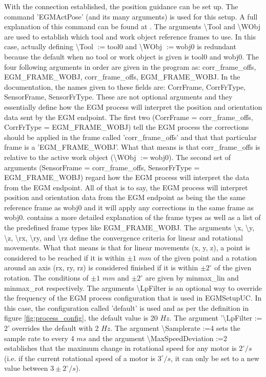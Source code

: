\documentclass{cslthse-msc}
\begin{document}
With the connection established, the position guidance can be set up. The command 'EGMActPose' (and its many arguments) is used for this setup. A full explanation of this command can be found at \cite[Sec. 1.67]{ABB:rapid_instructions}. The arguments \textbackslash Tool and \textbackslash WObj are used to establish which tool and work object reference frames to use. In this case, actually defining \textbackslash Tool $:=$tool0 and \textbackslash WObj $:=$wobj0 is redundant because the default when no tool or work object is given is tool0 and wobj0. The four following arguments in order are given in the program as: corr\_frame\_offs, {\scriptsize{EGM\_FRAME\_WOBJ}}, corr\_frame\_offs, {\scriptsize{EGM\_FRAME\_WOBJ}}. In the documentation, the names given to these fields are: CorrFrame, CorrFrType, SensorFrame, SensorFrType. These are not optional arguments and they essentially define how the EGM process will interpret the position and orientation data sent by the EGM endpoint. The first two (CorrFrame = corr\_frame\_offs, CorrFrType = {\scriptsize{EGM\_FRAME\_WOBJ}}) tell the EGM process the corrections should be applied in the frame called 'corr\_frame\_offs' and that that particular frame is a '{\scriptsize{EGM\_FRAME\_WOBJ}}'. What that means is that corr\_frame\_offs is relative to the active work object (\textbackslash WObj $:=$wobj0). The second set of arguments (SensorFrame = corr\_frame\_offs, SensorFrType = {\scriptsize{EGM\_FRAME\_WOBJ}}) regard how the EGM process will interpret the data from the EGM endpoint. All of that is to say, the EGM process will interpret position and orientation data from the EGM endpoint as being the the same reference frame as wobj0 and it will apply any corrections in the same frame as wobj0. \cite[Sec. 3.24]{ABB:rapid_instructions} contains a more detailed explanation of the frame types as well as a list of the predefined frame types like {\scriptsize{EGM\_FRAME\_WOBJ}}. The arguments \textbackslash x, \textbackslash y, \textbackslash z, \textbackslash rx, \textbackslash ry, and \textbackslash rz define the convergence criteria for linear and rotational movements. What that means is that for linear movements (x, y, z), a point is considered to be reached if it is within $\pm 1$ $mm$ of the given point and a rotation around an axis (rx, ry, rz) is considered finished if it is within $\pm 2^{\circ}$ of the given rotation. The conditions of $\pm 1$ $mm$ and $\pm 2^{\circ}$ are given by minmax\_lin and minmax\_rot respectively. The arguments \textbackslash LpFilter is an optional way to override the frequency of the EGM process configuration that is used in EGMSetupUC. In this case, the configuration called 'default' is used and as per the definition in figure \ref{fig:process_config}, the default value is 20 $Hz$. The argument '\textbackslash LpFilter := 2' overrides the default with 2 $Hz$. The argument \textbackslash Samplerate :=4 sets the sample rate to every 4 $ms$ and the argument \textbackslash MaxSpeedDeviation :=2 establishes that the maximum change in rotational speed for any motor is $2^{\circ}/s$ (i.e. if the current rotational speed of a motor is $3^{\circ}/s$, it can only be set to a new value between $3\pm2^{\circ}/s$). \par
\end{document}
